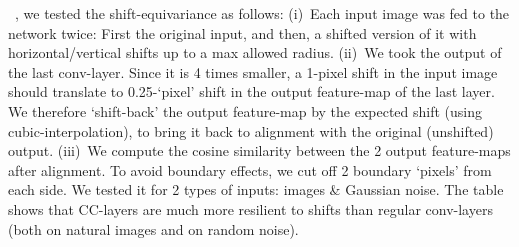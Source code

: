 ~\cite{zhang2019shiftinvar}, we tested the shift-equivariance as follows: (i)~Each input image was fed to the network twice: First the original input, and then, a shifted version of it with horizontal/vertical shifts up to a max allowed radius. (ii)~We took the output of the last conv-layer. Since it is 4 times smaller, a 1-pixel shift in the input image should translate to 0.25-`pixel' shift in the output feature-map of the last layer. We therefore `shift-back' the output feature-map by the expected shift (using cubic-interpolation), to bring it back to alignment with the original (unshifted) output.
(iii)~We compute the cosine similarity between the 2 output feature-maps after alignment. To avoid boundary effects, we cut off 2 boundary `pixels' from each side.
%
 We tested it for 2 types of inputs: images \& Gaussian noise. The table shows that CC-layers are much more resilient to shifts than regular conv-layers (both on natural images and on random noise). 

